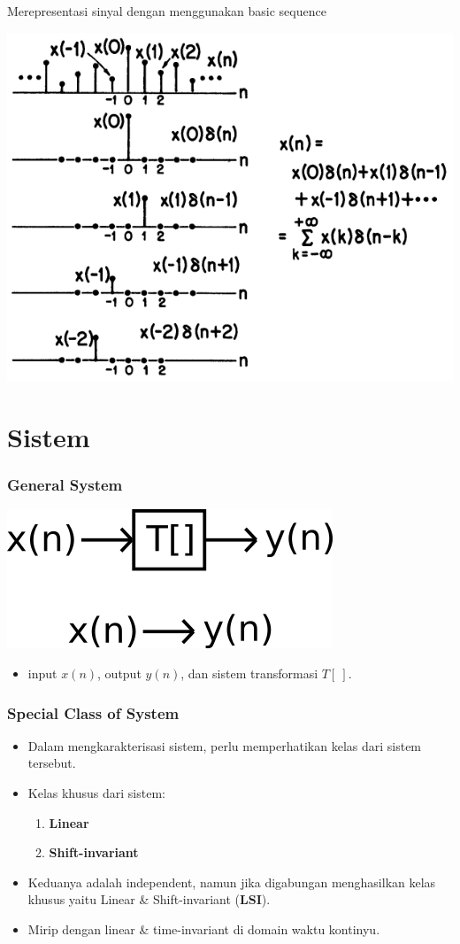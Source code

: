 \documentclass[pdflatex,compress]{beamer}
\begin{document}
\begin{frame}{Merepresentasi sinyal dengan menggunakan basic sequence}
	\begin{center}
		\includegraphics[width=0.8\linewidth]{img/img012}
	\end{center}
\end{frame}

\section{Sistem}

\begin{frame}
	\frametitle{General System}
	\begin{center}
		\includegraphics[width=0.5\linewidth]{img/img013}
	\end{center}
	\begin{itemize}
		\item input $ x(n) $, output $ y(n) $, dan sistem transformasi $ T[~] $.
	\end{itemize}
\end{frame}

\begin{frame}
	\frametitle{Special Class of System}
	\begin{itemize}
		\item Dalam mengkarakterisasi sistem, perlu memperhatikan kelas dari sistem tersebut.
		\item Kelas khusus dari sistem: 
		\begin{enumerate}
			\item \textbf{Linear}
			\item \textbf{Shift-invariant}
		\end{enumerate}
		\item Keduanya adalah independent, namun jika digabungan menghasilkan kelas khusus yaitu Linear \& Shift-invariant (\textbf{LSI}).
		\item Mirip dengan linear \& time-invariant di domain waktu kontinyu.
	\end{itemize}
\end{frame}
\end{document}
